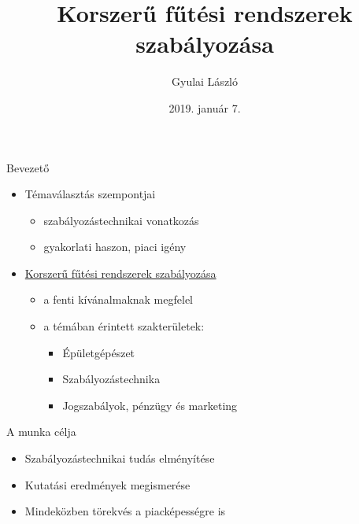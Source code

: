 \documentclass[14pt,handout]{beamer}
\title{Korszerű fűtési rendszerek szabályozása}
\author{Gyulai László}
\date{2019. január 7.}
\begin{document}
	
	\frame{\titlepage}
\begin{frame}{Bevezető}

    \begin{itemize}
        \item Témaválasztás szempontjai
        \pause
        \setlength{\itemsep}{6pt}
        \begin{itemize}
            \item szabályozástechnikai vonatkozás
            \item gyakorlati haszon, piaci igény 
        \end{itemize}
    	\pause
    	\item \underline{Korszerű fűtési rendszerek szabályozása}
    	\pause
        \begin{itemize}
            \setlength{\itemsep}{3pt}
        	\item a fenti kívánalmaknak megfelel
        	        	
	    	\item a témában érintett szakterületek:
	    	\pause
	        \begin{itemize}
	            \item Épületgépészet
	            \item Szabályozástechnika
	            \item Jogszabályok, pénzügy és marketing 
	        \end{itemize}
        \end{itemize}
    \end{itemize}

\end{frame}

\begin{frame}{A munka célja}
\begin{itemize}
	\setlength{\itemsep}{6pt}
	\item Szabályozástechnikai tudás elményítése
	\item Kutatási eredmények megismerése
	\item Mindeközben törekvés a piacképességre is	
\end{itemize}
\end{frame}
\end{document}
